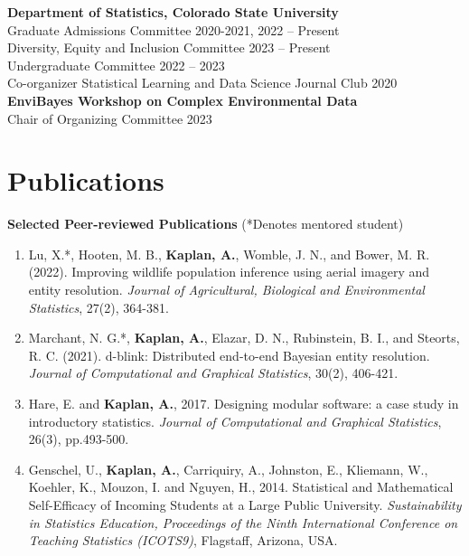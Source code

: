 \documentclass[margin,line]{res}
\begin{document}
\begin{resume}
\vspace{-.3cm}
{\bf Department of Statistics, Colorado State University} \\
Graduate Admissions Committee \hfill {2020-2021, 2022 -- Present} \\
Diversity, Equity and Inclusion Committee \hfill {2023 -- Present} \\
Undergraduate Committee \hfill {2022 -- 2023} \\
Co-organizer Statistical Learning and Data Science Journal Club \hfill {2020} \\

\vspace{-.3cm}
{\bf EnviBayes Workshop on Complex Environmental Data} \\
Chair of Organizing Committee \hfill 2023 

\section{\sc Publications}


{\bf Selected Peer-reviewed Publications} (*Denotes mentored student) \\
\begin{enumerate}
\item Lu, X.*, Hooten, M. B., {\bf Kaplan, A.}, Womble, J. N., and Bower, M. R. (2022). Improving wildlife population inference using aerial imagery and entity resolution. {\em Journal of Agricultural, Biological and Environmental Statistics}, 27(2), 364-381.
\item Marchant, N. G.*, {\bf Kaplan, A.}, Elazar, D. N., Rubinstein, B. I., and Steorts, R. C. (2021). d-blink: Distributed end-to-end Bayesian entity resolution. {\em Journal of Computational and Graphical Statistics}, 30(2), 406-421.
\item Hare, E. and {\bf Kaplan, A.}, 2017. Designing modular software: a case study in introductory statistics. {\em Journal of Computational and Graphical Statistics}, 26(3), pp.493-500.
\item Genschel, U., {\bf Kaplan, A.}, Carriquiry, A., Johnston, E., Kliemann, W., Koehler, K., Mouzon, I. and Nguyen, H., 2014. Statistical and Mathematical Self-Efficacy of Incoming Students at a Large Public University. {\em Sustainability in Statistics Education, Proceedings of the Ninth International Conference on Teaching Statistics (ICOTS9)}, Flagstaff, Arizona, USA.
\end{enumerate}



\end{resume}
\end{document}
